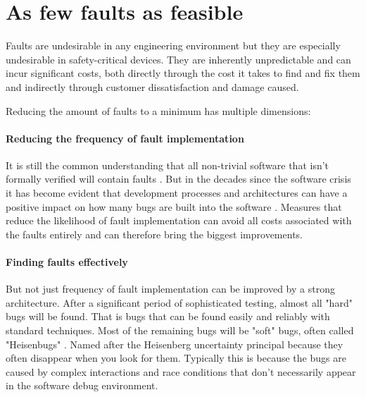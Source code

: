 \section{As few faults as feasible}
Faults are undesirable in any engineering environment but they are especially undesirable in safety-critical devices. They are inherently unpredictable and can incur significant costs, both directly through the cost it takes to find and fix them and indirectly through customer dissatisfaction and damage caused.

Reducing the amount of faults to a minimum has multiple dimensions:
\paragraph{Reducing the frequency of fault implementation}
It is still the common understanding that all non-trivial software that isn't formally verified will contain faults \cite{Klein.2009}. But in the decades since the software crisis it has become evident that development processes and architectures can have a positive impact on how many bugs are built into the software \cite{Randell.1996}.  Measures that reduce the likelihood of fault implementation can avoid all costs associated with the faults entirely and can therefore bring the biggest improvements. 
\paragraph{Finding faults effectively}
But not just frequency of fault implementation can be improved by a strong architecture. After a significant period of sophisticated testing, almost all "hard" bugs will be found. That is bugs that can be found easily and reliably with standard techniques. Most of the remaining bugs will be "soft" bugs, often called "Heisenbugs" \cite{Gray.1986}. Named after the Heisenberg uncertainty principal because they often disappear when you look for them. Typically this is because the bugs are caused by complex interactions and race conditions that don't necessarily appear in the software debug environment.

